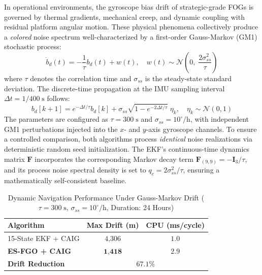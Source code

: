 \documentclass[journal]{IEEEtran}
\begin{document}
	In operational environments, the gyroscope bias drift of strategic-grade FOGs is governed by thermal gradients, mechanical creep, and dynamic coupling with residual platform angular motion. These physical phenomena collectively produce a \textit{colored} noise spectrum well-characterized by a first-order Gauss-Markov (GM1) stochastic process:
	\begin{equation}
		\dot{b}_d(t) = -\frac{1}{\tau}b_d(t) + w(t), \quad w(t) \sim \mathcal{N}\!\left(0,\; \frac{2\sigma_{ss}^2}{\tau}\right)
		\label{eq:markov_cont}
	\end{equation}
	where $\tau$ denotes the correlation time and $\sigma_{ss}$ is the steady-state standard deviation. The discrete-time propagation at the IMU sampling interval $\Delta t = 1/400\;\text{s}$ follows:
	\begin{equation}
		b_d[k{+}1] = e^{-\Delta t / \tau} b_d[k] + \sigma_{ss}\sqrt{1 - e^{-2\Delta t/\tau}}\;\eta_k, \quad \eta_k \sim \mathcal{N}(0,1)
		\label{eq:markov_disc}
	\end{equation}
	The parameters are configured as $\tau = 300\;\text{s}$ and $\sigma_{ss} = 10^\circ/\text{h}$, with independent GM1 perturbations injected into the $x$- and $y$-axis gyroscope channels. To ensure a controlled comparison, both algorithms process \textit{identical} noise realizations via deterministic random seed initialization. The EKF's continuous-time dynamics matrix $\bm{F}$ incorporates the corresponding Markov decay term $\bm{F}_{(9,9)} = -\bm{I}_{3}/\tau$, and its process noise spectral density is set to $q_c = 2\sigma_{ss}^2/\tau$, ensuring a mathematically self-consistent baseline.
	
	\begin{table}[htbp]
		\caption{Dynamic Navigation Performance Under Gauss-Markov Drift ($\tau = 300\;\text{s}$, $\sigma_{ss} = 10^\circ/\text{h}$, Duration: 24 Hours)}
		\label{tab:dynamic_comparison}
		\centering
		\begin{tabular}{lcc}
			\toprule
			\textbf{Algorithm} & \textbf{Max Drift (m)} & \textbf{CPU (ms/cycle)} \\
			\midrule
			15-State EKF + CAIG & $4\text{,}306$ & $1.0$ \\
			\textbf{ES-FGO + CAIG} & $\mathbf{1\text{,}418}$ & $\mathbf{2.9}$ \\
			\midrule
			\textbf{Drift Reduction} & \multicolumn{2}{c}{$\mathbf{67.1\%}$} \\
			\bottomrule
		\end{tabular}
	\end{table}
	
\end{document}
